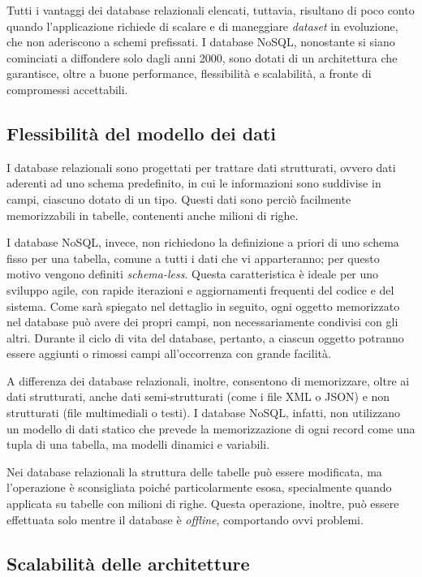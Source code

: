 Tutti i vantaggi dei database relazionali elencati, tuttavia, risultano di poco conto quando l’applicazione richiede di scalare e di maneggiare \textit{dataset} in evoluzione, che 
non aderiscono a schemi prefissati. I database NoSQL, nonostante si siano cominciati a diffondere solo dagli anni 2000, sono dotati di un architettura che garantisce, oltre 
a buone performance, flessibilità e scalabilità, a fronte di compromessi accettabili.


\subsection{Flessibilità del modello dei dati}

I database relazionali sono progettati per trattare dati strutturati, ovvero dati aderenti ad uno schema predefinito, in cui le informazioni sono suddivise in campi, ciascuno 
dotato di un tipo. Questi dati sono perciò facilmente memorizzabili in tabelle, contenenti anche milioni di righe.

I database NoSQL, invece, non richiedono la definizione a priori di uno schema fisso per una tabella, comune a tutti i dati che vi apparteranno; per questo motivo vengono definiti 
\textit{schema-less}. Questa caratteristica è ideale per uno sviluppo agile, con rapide iterazioni e aggiornamenti frequenti del codice e del sistema. Come sarà spiegato nel dettaglio in
seguito, ogni oggetto memorizzato nel database può avere dei propri campi, non necessariamente condivisi con gli altri. Durante il ciclo di vita del database, pertanto, a ciascun 
oggetto potranno essere aggiunti o rimossi campi all’occorrenza con grande facilità.

A differenza dei database relazionali, inoltre, consentono di memorizzare, oltre ai dati strutturati, anche dati semi-strutturati (come i file XML o JSON) e non strutturati 
(file multimediali o testi). I database NoSQL, infatti, non utilizzano un modello di dati statico che prevede la memorizzazione di ogni record come una tupla di una tabella, 
ma modelli dinamici e variabili.

Nei database relazionali la struttura delle tabelle può essere modificata, ma l’operazione è sconsigliata poiché particolarmente esosa, specialmente quando applicata su tabelle 
con milioni di righe. Questa operazione, inoltre, può essere effettuata solo mentre il database è \textit{offline}, comportando ovvi problemi.


\subsection{Scalabilità delle architetture}


